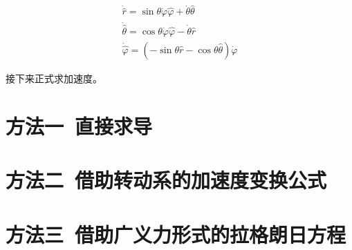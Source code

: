 \documentclass{ctexart}
\begin{document}
    \begin{gather*}
        \dot{\hat{r}} = \sin\theta\dot{\varphi}\hat{\varphi}+\dot{\theta}\hat{\theta} \\
        \dot{\hat{\theta}} = \cos\theta\dot{\varphi}\hat{\varphi}-\dot{\theta}\hat{r} \\
        \dot{\hat{\varphi}} = (-\sin\theta\hat{r}-\cos\theta\hat{\theta})\dot{\varphi}
    \end{gather*}

    接下来正式求加速度。

    \section[方法一 直接求导]{方法一~直接求导}\label{sec:2}

    \section[方法二 借助转动系的加速度变换公式]{方法二~借助转动系的加速度变换公式}\label{sec:3}

    \section[方法三 借助广义力形式的拉格朗日方程]{方法三~借助广义力形式的拉格朗日方程}\label{sec:4}
\end{document}
